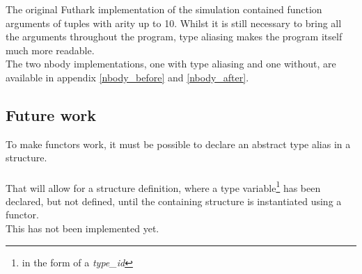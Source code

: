 The original Futhark implementation of the simulation contained function
arguments of tuples with arity up to 10. Whilst it is still necessary to bring
all the arguments throughout the program, type aliasing makes the program itself
much more readable.
\\
The two nbody implementations, one with type aliasing and one without, are
available in appendix \ref{nbody_before} and \ref{nbody_after}.
\subsection{Future work}
To make functors work, it must be possible to declare an abstract type alias in
a structure.\\
\\
That will allow for a structure definition, where a type variable\footnote{in the form of a \textit{type\_id}} has been declared, but not defined, until the containing structure is instantiated using a functor.
\\
This has not been implemented yet.
\clearpage